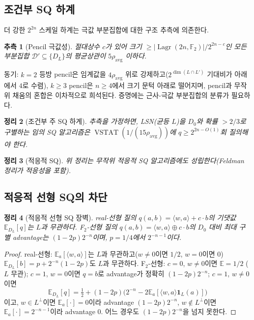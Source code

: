 \documentclass[11pt,a4paper]{article}
\theoremstyle{plain}
\newtheorem{theorem}{정리}[section]
\newtheorem{conjecture}[theorem]{추측}
\theoremstyle{definition}
\newcommand{\F}{\mathbb{F}}
\newcommand{\E}{\mathbb{E}}
\DeclareMathOperator{\Lagr}{Lagr}
\DeclareMathOperator{\VSTAT}{VSTAT}
\begin{document}
\subsection{조건부 SQ 하계}

더 강한 $2^{2n}$ 스케일 하계는 극값 부분집합에 대한 구조 추측에 의존한다.

\begin{conjecture}[Pencil 극값성]
\label{conj:pencil-ko}
절대상수 $c$가 있어 크기 $\ge |\Lagr(2n,\F_2)|/2^{2n-c}$인 모든 부분집합 $\mathcal{D}' \subseteq \{D_L\}$의 평균상관이 $5\rho_{\mathrm{avg}}$ 이하다.
\end{conjecture}

동기: $k=2$ 등방 pencil은 임계값을 $4\rho_{\mathrm{avg}}$ 위로 강제하고($2^{\dim(L\cap L')}$ 기대비가 아래에서 $4$로 수렴), $k \ge 3$ pencil은 $n \ge 4$에서 크기 문턱 아래로 떨어지며, pencil과 무작위 채움의 혼합은 이차적으로 희석된다. 증명에는 근사-극값 부분집합의 분류가 필요하다.

\begin{theorem}[조건부 주 SQ 하계]
추측을 가정하면, LSN(균등 $L$)을 $D_0$와 확률 $>2/3$로 구별하는 임의 SQ 알고리즘은 $\VSTAT(1/(15\rho_{\mathrm{avg}}))$에 $q \ge 2^{2n-O(1)}$회 질의해야 한다.
\end{theorem}

\begin{theorem}[적응적 SQ]
위 정리는 무작위 적응적 SQ 알고리즘에도 성립한다(Feldman 정리가 적응성을 포함).
\end{theorem}

\subsection{적응적 선형 SQ의 차단}

\begin{theorem}[적응적 선형 SQ 장벽]
real-선형 질의 $q(a,b) = \langle w,a\rangle + c\cdot b$의 기댓값 $\E_{D_L}[q]$는 $L$과 무관하다. F$_2$-선형 질의 $q(a,b) = \langle w,a\rangle \oplus c\cdot b$의 $D_0$ 대비 최대 구별 advantage는 $(1-2p)2^{-n}$이며, $p=1/4$에서 $2^{-n-1}$이다.
\end{theorem}

\begin{proof}
real-선형: $\E_a[\langle w,a\rangle]$는 $L$과 무관하고($w\neq 0$이면 $1/2$, $w=0$이면 $0$) $\E_{D_L}[b] = p + 2^{-n}(1-2p)$도 $L$과 무관하다. F$_2$-선형: $c=0$, $w\neq 0$이면 $\E = 1/2$ ($L$ 무관); $c=1$, $w=0$이면 $q=b$로 advantage가 정확히 $(1-2p)2^{-n}$; $c=1$, $w\neq 0$이면
\[
\E_{D_L}[q] = \tfrac12 + (1-2p)\bigl(2^{-n} - 2\E_a[\langle w,a\rangle\mathbf{1}_L(a)]\bigr)
\]
이고, $w \in L^\perp$이면 $\E_a[\cdot]=0$이라 advantage $(1-2p)2^{-n}$, $w \notin L^\perp$이면 $\E_a[\cdot]=2^{-n-1}$이라 advantage $0$. 어느 경우도 $(1-2p)2^{-n}$을 넘지 못한다.
\end{proof}
\end{document}
